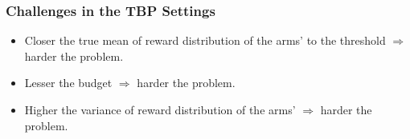 \begin{frame}
\frametitle{Challenges in the TBP Settings}

\begin{itemize}
\item<1-> Closer the true mean of reward distribution of the arms' to the threshold $\Rightarrow$ harder the problem.
\item<2-> Lesser the budget $\Rightarrow$ harder the problem.
\item<3-> Higher the variance of reward distribution of the arms' $\Rightarrow$ harder the problem.


\end{itemize}

\end{frame}



